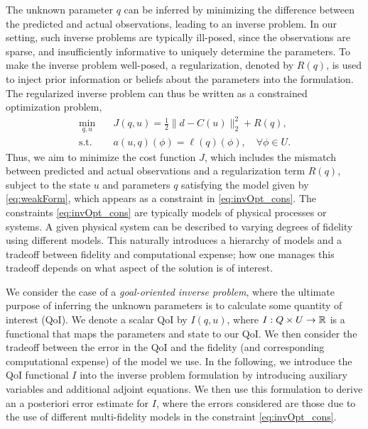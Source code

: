 The unknown parameter $q$ can be inferred by minimizing the difference between the predicted and actual observations, leading to an inverse problem. In our setting, such inverse problems are typically ill-posed, since the observations are sparse, and insufficiently informative to uniquely determine the parameters. To make the inverse problem well-posed, a regularization, denoted by $R(q)$, is used to inject prior information or beliefs about the parameters into the formulation. The regularized inverse problem can thus be written as a constrained optimization problem,
%
\begin{subequations}
\label{eq:invOpt}
\begin{align}
\min\limits_{q,u} & \quad J(q,u)=\frac{1}{2}\|d-C(u)\|_2^2 + R(q), \label{eq:invOpt_obj} \\
\textrm{s.t. }& \quad a(u,q)(\phi)=\ell(q)(\phi),\quad\forall\phi\in U. \label{eq:invOpt_cons}
\end{align}
\end{subequations}
%
Thus, we aim to minimize the cost function $J$, which includes the mismatch between predicted and actual observations and a regularization term $R(q)$, subject to the state $u$ and parameters $q$ satisfying the model given by \cref{eq:weakForm}, which appears as a constraint in \cref{eq:invOpt_cons}. The constraints \cref{eq:invOpt_cons} are typically models of physical processes or systems. A given physical system can be described to varying degrees of fidelity using different models. This naturally introduces a hierarchy of models and a tradeoff between fidelity and computational expense; how one manages this tradeoff depends on what aspect of the solution is of interest.

We consider the case of a {\em goal-oriented inverse problem}, where the ultimate purpose of inferring the unknown parameters is to calculate some quantity of interest (QoI). We denote a scalar QoI by $I(q,u)$, where $I:Q\times U\to{\mathbb{R}}$ is a functional that maps the parameters and state to our QoI. We then consider the tradeoff between the error in the QoI and the fidelity (and corresponding computational expense) of the model we use. In the following, we introduce the QoI functional $I$ into the inverse problem formulation by introducing auxiliary variables and additional adjoint equations. We then use this formulation to derive an a posteriori error estimate for $I$, where the errors considered are those due to the use of different multi-fidelity models in the constraint \cref{eq:invOpt_cons}.
%
